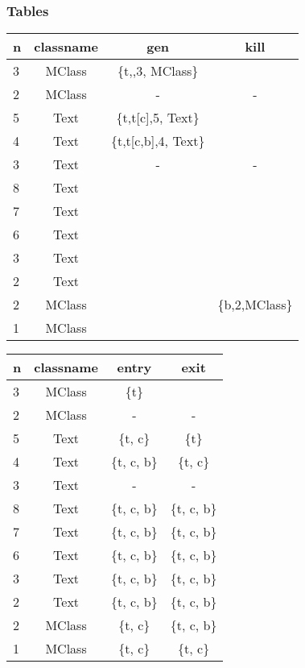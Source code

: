 \documentclass[letterpaper,twocolumn,10pt]{article}
\begin{document}
\subsubsection{Tables}
\begin{center}
\begin{supertabular}{|l|*{3}{c|}}
  \hline
  n & classname & gen & kill  \\
   & MClass & \{t,,3, MClass\} & \\ 
  2 & MClass & - & - \\
  5 & Text & \{t,t[c],5, Text\} & \\
  4 & Text & \{t,t[c,b],4, Text\} & \\
  3 & Text & - & - \\
  8 & Text &  & \\
  7 & Text &  & \\
  6 & Text &  & \\
  3 & Text &  & \\
  2 & Text &  & \\
  2 & MClass &  & \{b,2,MClass\}\\
  1 & MClass &  & \\
  \hline
\end{supertabular}
\end{center}
\begin{center}
\begin{supertabular}{|l|*{3}{c|}}
  \hline
  n & classname & entry & exit  \\
   & MClass & \{t\} &  \\ 
  2 & MClass & - & -\\
  5 & Text & \{t, c\} & \{t\} \\
  4 & Text & \{t, c, b\} & \{t, c\} \\
  3 & Text & - & - \\
  8 & Text & \{t, c, b\} & \{t, c, b\}    \\
  7 & Text & \{t, c, b\} & \{t, c, b\}    \\
  6 & Text & \{t, c, b\} & \{t, c, b\}    \\
  3 & Text & \{t, c, b\} & \{t, c, b\}    \\
  2 & Text & \{t, c, b\} & \{t, c, b\}    \\
  2 & MClass & \{t, c\} & \{t, c, b\}    \\
  1 & MClass & \{t, c\} & \{t, c\}    \\
  \hline
\end{supertabular}
\end{center}
\end{document}
